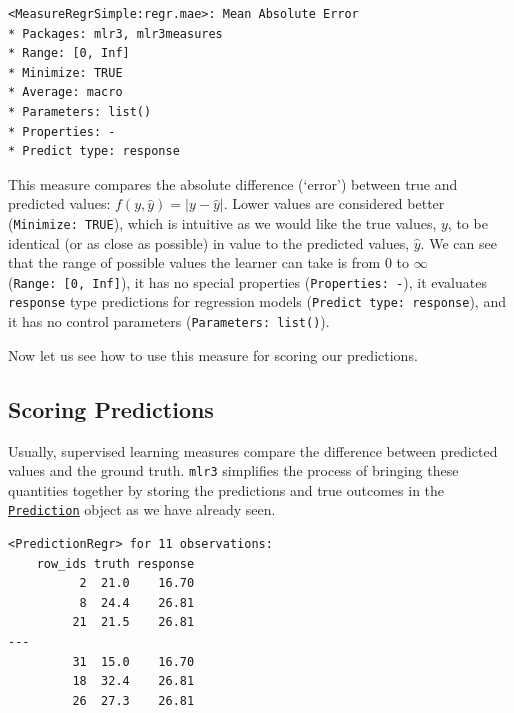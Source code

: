 \begin{Shaded}
\begin{Highlighting}[]
\OtherTok{=} \NormalTok{(}\NormalTok{)}
\end{Highlighting}
\end{Shaded}

\begin{verbatim}
<MeasureRegrSimple:regr.mae>: Mean Absolute Error
* Packages: mlr3, mlr3measures
* Range: [0, Inf]
* Minimize: TRUE
* Average: macro
* Parameters: list()
* Properties: -
* Predict type: response
\end{verbatim}

This measure compares the absolute difference (`error') between true and
predicted values: \(f(y, \hat{y}) = | y - \hat{y} |\). Lower values are
considered better (\texttt{Minimize:\ TRUE}), which is intuitive as we
would like the true values, \(y\), to be identical (or as close as
possible) in value to the predicted values, \(\hat{y}\). We can see that
the range of possible values the learner can take is from \(0\) to
\(\infty\) (\texttt{Range:\ {[}0,\ Inf{]}}), it has no special
properties (\texttt{Properties:\ -}), it evaluates \texttt{response}
type predictions for regression models
(\texttt{Predict\ type:\ response}), and it has no control parameters
(\texttt{Parameters:\ list()}).

Now let us see how to use this measure for scoring our predictions.

\hypertarget{scoring-predictions}{%
\subsection{Scoring Predictions}\label{scoring-predictions}}

Usually, supervised learning measures compare the difference between
predicted values and the ground truth. \texttt{mlr3} simplifies the
process of bringing these quantities together by storing the predictions
and true outcomes in the
\href{https://mlr3.mlr-org.com/reference/Prediction.html}{\texttt{Prediction}}
object as we have already seen.

\begin{Shaded}
\begin{Highlighting}[]
\end{Highlighting}
\end{Shaded}

\begin{verbatim}
<PredictionRegr> for 11 observations:
    row_ids truth response
          2  21.0    16.70
          8  24.4    26.81
         21  21.5    26.81
---                       
         31  15.0    16.70
         18  32.4    26.81
         26  27.3    26.81
\end{verbatim}


